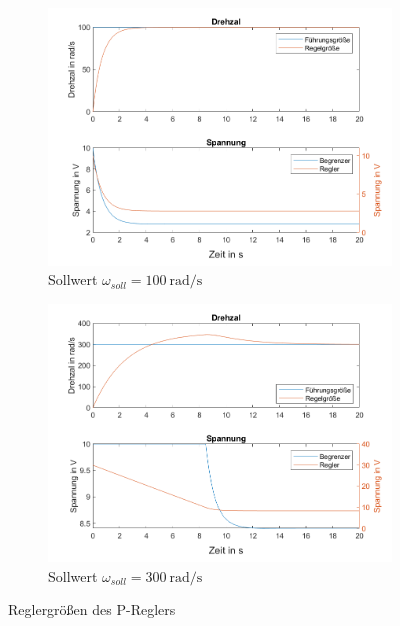 \documentclass[
    paper=a4,
    fontsize=10pt,
    DIV=12,
    oneside,
]{scrartcl}
\begin{document}
    \begin{figure}[hbt]
        \centering
        \begin{subfigure}{0.5\columnwidth}
            \includegraphics[width=1.0\columnwidth]{../versuch3/graphPiController.png}
            \caption{Sollwert \(\omega_{soll} = \SI{100}{\radian\per\second}\)}
            \label{fig:graphPiController}   
        \end{subfigure}%
        \hfill%
        \begin{subfigure}{0.5\columnwidth}
            \includegraphics[width=1.0\columnwidth]{../versuch3/graphPiControllerNew.png}
            \caption{Sollwert \(\omega_{soll} = \SI{300}{\radian\per\second}\)}
            \label{fig:graphPiControllerNew}
        \end{subfigure}
        \caption{Reglergrößen des P-Reglers}
    \end{figure}
\end{document}
